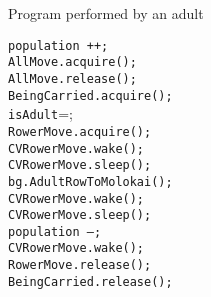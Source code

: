 \documentclass{article}
\begin{document}
\begin{spacing}{1.1}
    \begin{algorithm}
      \caption{Program performed by an adult}
      \begin{algorithmic}[1]
	\STATE \texttt{population ++;}\\
	\STATE \texttt{AllMove.acquire();}\\
	\STATE \texttt{AllMove.release();}\\
	\STATE \texttt{BeingCarried.acquire();}\\
	\STATE \texttt{isAdult}=\TRUE;\\
	\STATE \texttt{RowerMove.acquire();}\\
	\STATE \texttt{CVRowerMove.wake();}\\
	\STATE \texttt{CVRowerMove.sleep();}\\
	\STATE \texttt{bg.AdultRowToMolokai();}\\
	\STATE \texttt{CVRowerMove.wake();}\\
	\STATE \texttt{CVRowerMove.sleep();}\\
	\STATE \texttt{population --;}\\
	\STATE \texttt{CVRowerMove.wake();}\\
	\STATE \texttt{RowerMove.release();}\\
	\STATE \texttt{BeingCarried.release();}\\
	\STATE \texttt{\RETURN}\\
      \end{algorithmic}
    \end{algorithm}



\end{spacing}
\end{document}
